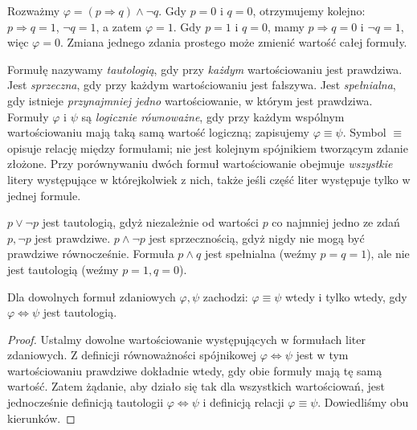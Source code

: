 \begin{przyklad}
Rozważmy $\varphi=(p\Rightarrow q)\land\neg q$.
Gdy $p=0$ i $q=0$, otrzymujemy kolejno:
$p\Rightarrow q=1$, $\neg q=1$, a zatem $\varphi=1$.
Gdy $p=1$ i $q=0$, mamy $p\Rightarrow q=0$ i
$\neg q=1$, więc $\varphi=0$. Zmiana jednego zdania
prostego może zmienić wartość całej formuły.
\end{przyklad}

\begin{definicja}\label{def:tautology}
Formułę nazywamy \emph{tautologią}, gdy przy \emph{każdym}
wartościowaniu jest prawdziwa. Jest \emph{sprzeczna}, gdy
przy każdym wartościowaniu jest fałszywa.
Jest \emph{spełnialna}, gdy istnieje \emph{przynajmniej jedno}
wartościowanie, w którym jest prawdziwa. Formuły
$\varphi$ i $\psi$ są \emph{logicznie równoważne},
gdy przy każdym wspólnym wartościowaniu mają taką samą
wartość logiczną; zapisujemy $\varphi\equiv\psi$.
Symbol $\equiv$ opisuje relację między formułami;
nie jest kolejnym spójnikiem tworzącym zdanie złożone.
Przy porównywaniu dwóch formuł wartościowanie obejmuje
\emph{wszystkie} litery występujące w którejkolwiek z nich,
także jeśli część liter występuje tylko w jednej formule.
\end{definicja}

\begin{przyklad}
$p\lor\neg p$ jest tautologią, gdyż niezależnie od wartości
$p$ co najmniej jedno ze zdań $p,\neg p$ jest prawdziwe.
$p\land\neg p$ jest sprzecznością, gdyż nigdy nie mogą
być prawdziwe równocześnie. Formuła $p\land q$ jest
spełnialna (weźmy $p=q=1$), ale nie jest tautologią
(weźmy $p=1,q=0$).
\end{przyklad}

\begin{twierdzenie}\label{thm:equiv-test}
Dla dowolnych formuł zdaniowych $\varphi,\psi$ zachodzi:
$\varphi\equiv\psi$ wtedy i tylko wtedy, gdy
$\varphi\Leftrightarrow\psi$ jest tautologią.
\end{twierdzenie}
\begin{proof}
Ustalmy dowolne wartościowanie występujących w formułach
liter zdaniowych. Z definicji równoważności spójnikowej
$\varphi\Leftrightarrow\psi$ jest w tym wartościowaniu
prawdziwe dokładnie wtedy, gdy obie formuły mają tę samą
wartość. Zatem żądanie, aby działo się tak dla wszystkich
wartościowań, jest jednocześnie definicją tautologii
$\varphi\Leftrightarrow\psi$ i definicją relacji
$\varphi\equiv\psi$. Dowiedliśmy obu kierunków.
\end{proof}

